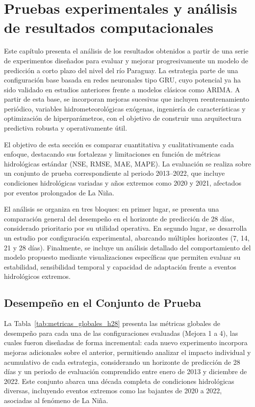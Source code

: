 \clearpage %
\chapter{Pruebas experimentales y análisis de resultados computacionales}
\label{sec:Pruebas experimentales y análisis de resultados computacionales}

Este capítulo presenta el análisis de los resultados obtenidos a partir de una serie de experimentos diseñados para evaluar y mejorar progresivamente un modelo de predicción a corto plazo del nivel del río Paraguay. La estrategia parte de una configuración base basada en redes neuronales tipo GRU, cuyo potencial ya ha sido validado en estudios anteriores frente a modelos clásicos como ARIMA. A partir de esta base, se incorporan mejoras sucesivas que incluyen reentrenamiento periódico, variables hidrometeorológicas exógenas, ingeniería de características y optimización de hiperparámetros, con el objetivo de construir una arquitectura predictiva robusta y operativamente útil.

El objetivo de esta sección es comparar cuantitativa y cualitativamente cada enfoque, destacando sus fortalezas y limitaciones en función de métricas hidrológicas estándar (NSE, RMSE, MAE, MAPE). La evaluación se realiza sobre un conjunto de prueba correspondiente al periodo 2013–2022, que incluye condiciones hidrológicas variadas y años extremos como 2020 y 2021, afectados por eventos prolongados de La Niña.

El análisis se organiza en tres bloques: en primer lugar, se presenta una comparación general del desempeño en el horizonte de predicción de 28 días, considerado prioritario por su utilidad operativa. En segundo lugar, se desarrolla un estudio por configuración experimental, abarcando múltiples horizontes (7, 14, 21 y 28 días). Finalmente, se incluye un análisis detallado del comportamiento del modelo propuesto mediante visualizaciones específicas que permiten evaluar su estabilidad, sensibilidad temporal y capacidad de adaptación frente a eventos hidrológicos extremos.



\section{Desempeño en el Conjunto de Prueba}
\label{sec:desempeno_prueba}

La Tabla~\ref{tab:metricas_globales_h28} presenta las métricas globales de desempeño para cada una de las configuraciones evaluadas (Mejora 1 a 4), las cuales fueron diseñadas de forma incremental: cada nuevo experimento incorpora mejoras adicionales sobre el anterior, permitiendo analizar el impacto individual y acumulativo de cada estrategia, considerando un horizonte de predicción de 28 días y un periodo de evaluación comprendido entre enero de 2013 y diciembre de 2022. Este conjunto abarca una década completa de condiciones hidrológicas diversas, incluyendo eventos extremos como las bajantes de 2020 a 2022, asociadas al fenómeno de La Niña.

